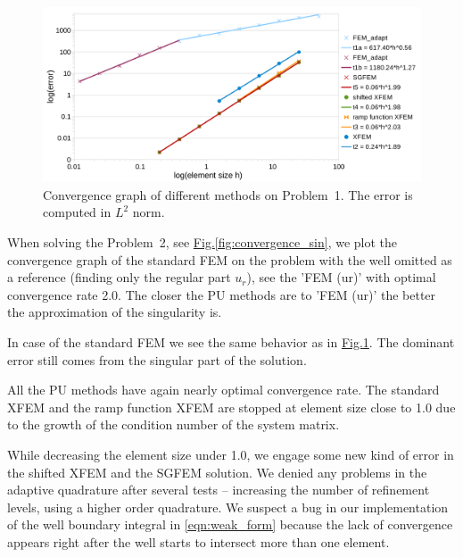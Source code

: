 \documentclass{elsarticle}
\newcommand{\prob}[1]{Problem~{#1}}
\newcommand{\fig}[1]{\hyperref[#1]{Fig.\ref{#1}}}
\begin{document}
\begin{figure}[!htb]
  \centering    
  \includegraphics[width=\textwidth]{results/convergence.pdf}
  \caption[Convergence graph \prob{1}]{Convergence graph of different methods on 
  \prob{1}. The error is computed in $L^2$ norm.}
  \label{fig:convergence}
\end{figure}

When solving the \prob{2}, see \fig{fig:convergence_sin}, we plot the convergence graph of the
standard FEM on the problem with the well omitted as a reference (finding only the regular part $u_r$), 
see the 'FEM (ur)' with optimal convergence rate 2.0. The closer the PU methods are to 'FEM (ur)' the better 
the approximation of the singularity is.

In case of the standard FEM we see the same behavior as in \fig{fig:convergence}. The dominant error still 
comes from the singular part of the solution. 

All the PU methods have again nearly optimal convergence rate. The standard XFEM and the ramp function XFEM
are stopped at element size close to 1.0 due to the growth of the condition number of the system matrix.

While decreasing the element size under 1.0, we engage some new kind of error in the shifted XFEM and the 
SGFEM solution. We denied any problems in the adaptive quadrature after several tests -- increasing the number
of refinement levels, using a higher order quadrature. We suspect a bug in our implementation of the well boundary 
integral in \eqref{eqn:weak_form} because the lack of convergence appears right after the well starts to 
intersect more than one element.
\end{document}
